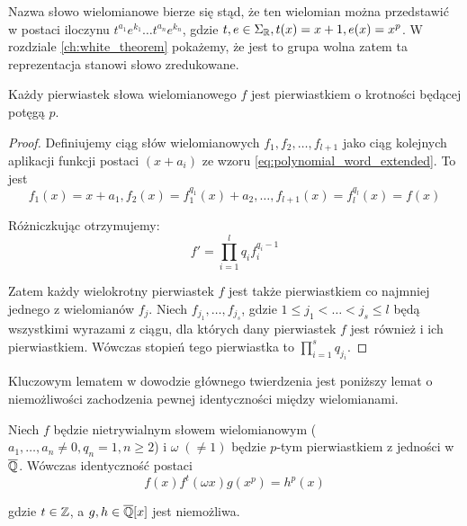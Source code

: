 Nazwa słowo wielomianowe bierze się stąd, że ten wielomian można przedstawić w
postaci iloczynu $t^{a_1}e^{k_1} \ldots t^{a_n}e^{k_n}$, gdzie $t, e \in
\Sigma_{\mathbb{R}}, t(x) = x + 1, e(x) = x^p$. W rozdziale \ref{ch:white_theorem}
pokażemy, że jest to grupa wolna zatem ta reprezentacja stanowi słowo
zredukowane.

\begin{lemma}
  Każdy pierwiastek słowa wielomianowego $f$ jest pierwiastkiem o krotności
  będącej potęgą $p$.
  \label{lem:multiplicity_lemma}
\end{lemma}

\begin{proof}
Definiujemy ciąg słów wielomianowych $f_1, f_2, \ldots, f_{l+1}$ jako ciąg
kolejnych aplikacji funkcji postaci $(x+a_i)$ ze wzoru
\ref{eq:polynomial_word_extended}.
To jest
\[f_1(x) = x + a_1, f_2(x) = f_1^{q_1}(x) + a_2, \ldots, f_{l+1}(x) =
f_l^{q_l}(x) = f(x)\]

Różniczkując otrzymujemy:
\[f' = \prod_{i=1}^l q_i f_i^{q_i - 1}\]

Zatem każdy wielokrotny pierwiastek $f$ jest także pierwiastkiem co najmniej
jednego z wielomianów $f_j$. Niech $f_{j_1}, \ldots, f_{j_s}$, gdzie $1 \leq j_1
< \ldots < j_s \leq l$ będą wszystkimi wyrazami z ciągu, dla których dany
pierwiastek $f$ jest również i ich pierwiastkiem. Wówczas stopień tego
pierwiastka to $\prod_{i=1}^s q_{j_i}$.
\end{proof}

Kluczowym lematem w dowodzie głównego twierdzenia jest poniższy lemat o
niemożliwości zachodzenia pewnej identyczności między wielomianami.

\begin{lemma}
  Niech $f$ będzie nietrywialnym słowem wielomianowym ($a_1, \ldots, a_n \neq
  0, {q_n = 1,} {n \geq 2}$) i $\omega \; (\neq 1)$ będzie $p$-tym pierwiastkiem
  z jedności w $\overline{\mathbb{Q}}$.
  Wówczas identyczność postaci
  \begin{equation}
    f(x)f^t(\omega x)g\left(x^p\right) = h^p(x)
    \label{eq:polynomial_lemma}
  \end{equation}

  gdzie $t \in \mathbb{Z}$, a $g, h \in \overline{\mathbb{Q}}[x]$ jest niemożliwa.
  \label{lem:main_polynomial_lemma}
\end{lemma}

